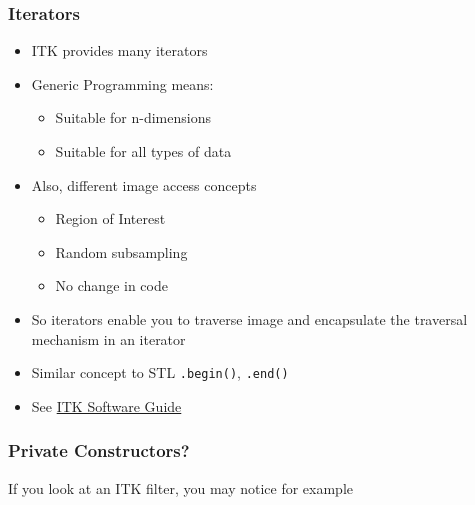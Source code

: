 \subsubsection{Iterators}\label{iterators-1}

\begin{itemize}
\itemsep1pt\parskip0pt
\item
  ITK provides many iterators
\item
  Generic Programming means:

  \begin{itemize}
  \itemsep1pt\parskip0pt
  \item
    Suitable for n-dimensions
  \item
    Suitable for all types of data
  \end{itemize}
\item
  Also, different image access concepts

  \begin{itemize}
  \itemsep1pt\parskip0pt
  \item
    Region of Interest
  \item
    Random subsampling
  \item
    No change in code
  \end{itemize}
\item
  So iterators enable you to traverse image and encapsulate the
  traversal mechanism in an iterator\\
\item
  Similar concept to STL \texttt{.begin()}, \texttt{.end()}
\item
  See \href{http://www.itk.org/ItkSoftwareGuide.pdf}{ITK Software Guide}
\end{itemize}

\subsubsection{Private Constructors?}\label{private-constructors}

If you look at an ITK filter, you may notice for example

\begin{Shaded}
\begin{Highlighting}[]
    \NormalTok{:}
       

    \NormalTok{:}
       
       \NormalTok{=(} 
\end{Highlighting}
\end{Shaded}

